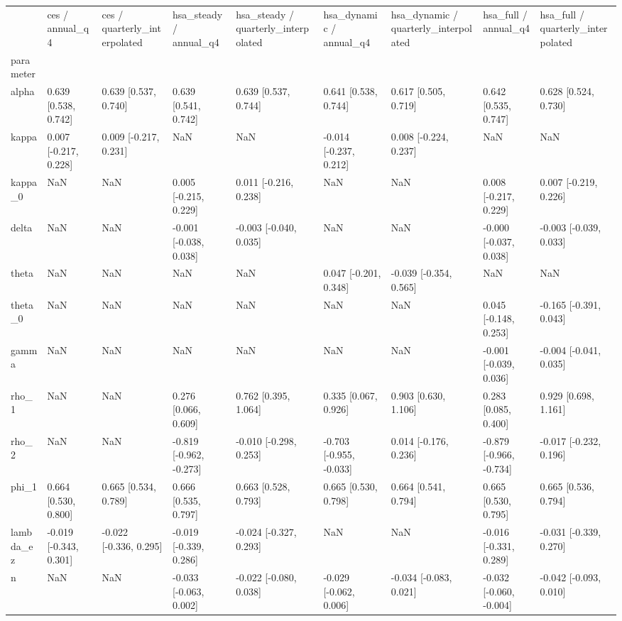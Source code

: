 \begin{tabular}{lllllllll}
\toprule
 & ces / annual\_q4 & ces / quarterly\_interpolated & hsa\_steady / annual\_q4 & hsa\_steady / quarterly\_interpolated & hsa\_dynamic / annual\_q4 & hsa\_dynamic / quarterly\_interpolated & hsa\_full / annual\_q4 & hsa\_full / quarterly\_interpolated \\
parameter &  &  &  &  &  &  &  &  \\
\midrule
alpha & 0.639 [0.538, 0.742] & 0.639 [0.537, 0.740] & 0.639 [0.541, 0.742] & 0.639 [0.537, 0.744] & 0.641 [0.538, 0.744] & 0.617 [0.505, 0.719] & 0.642 [0.535, 0.747] & 0.628 [0.524, 0.730] \\
kappa & 0.007 [-0.217, 0.228] & 0.009 [-0.217, 0.231] & NaN & NaN & -0.014 [-0.237, 0.212] & 0.008 [-0.224, 0.237] & NaN & NaN \\
kappa\_0 & NaN & NaN & 0.005 [-0.215, 0.229] & 0.011 [-0.216, 0.238] & NaN & NaN & 0.008 [-0.217, 0.229] & 0.007 [-0.219, 0.226] \\
delta & NaN & NaN & -0.001 [-0.038, 0.038] & -0.003 [-0.040, 0.035] & NaN & NaN & -0.000 [-0.037, 0.038] & -0.003 [-0.039, 0.033] \\
theta & NaN & NaN & NaN & NaN & 0.047 [-0.201, 0.348] & -0.039 [-0.354, 0.565] & NaN & NaN \\
theta\_0 & NaN & NaN & NaN & NaN & NaN & NaN & 0.045 [-0.148, 0.253] & -0.165 [-0.391, 0.043] \\
gamma & NaN & NaN & NaN & NaN & NaN & NaN & -0.001 [-0.039, 0.036] & -0.004 [-0.041, 0.035] \\
rho\_1 & NaN & NaN & 0.276 [0.066, 0.609] & 0.762 [0.395, 1.064] & 0.335 [0.067, 0.926] & 0.903 [0.630, 1.106] & 0.283 [0.085, 0.400] & 0.929 [0.698, 1.161] \\
rho\_2 & NaN & NaN & -0.819 [-0.962, -0.273] & -0.010 [-0.298, 0.253] & -0.703 [-0.955, -0.033] & 0.014 [-0.176, 0.236] & -0.879 [-0.966, -0.734] & -0.017 [-0.232, 0.196] \\
phi\_1 & 0.664 [0.530, 0.800] & 0.665 [0.534, 0.789] & 0.666 [0.535, 0.797] & 0.663 [0.528, 0.793] & 0.665 [0.530, 0.798] & 0.664 [0.541, 0.794] & 0.665 [0.530, 0.795] & 0.665 [0.536, 0.794] \\
lambda\_ez & -0.019 [-0.343, 0.301] & -0.022 [-0.336, 0.295] & -0.019 [-0.339, 0.286] & -0.024 [-0.327, 0.293] & NaN & NaN & -0.016 [-0.331, 0.289] & -0.031 [-0.339, 0.270] \\
n & NaN & NaN & -0.033 [-0.063, 0.002] & -0.022 [-0.080, 0.038] & -0.029 [-0.062, 0.006] & -0.034 [-0.083, 0.021] & -0.032 [-0.060, -0.004] & -0.042 [-0.093, 0.010] \\
\bottomrule
\end{tabular}
